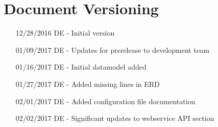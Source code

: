 \chapter*{Document Versioning}
\begin{enumerate}
    \item[12/28/2016] DE - Initial version
    \item[01/09/2017] DE - Updates for prerelease to development team
    \item[01/16/2017] DE - Initial datamodel added
    \item[01/27/2017] DE - Added missing lines in ERD
    \item[02/01/2017] DE - Added configuration file documentation
    \item[02/02/2017] DE - Significant updates to webservice API section
\end{enumerate}
